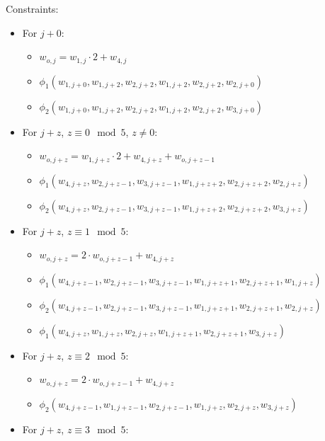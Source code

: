 Constraints:
\begin{itemize}
	\item For $j + 0$:
	\begin{itemize}
		\item $w_{o, j} = w_{1, j} \cdot 2 + w_{4, j}$
		\item $\phi_1(w_{1, j + 0}, w_{1, j + 2}, w_{2, j + 2}, w_{1, j + 2}, w_{2, j + 2}, w_{2, j + 0})$
		\item $\phi_2(w_{1, j + 0}, w_{1, j + 2}, w_{2, j + 2}, w_{1, j + 2}, w_{2, j + 2}, w_{3, j + 0})$
	\end{itemize}
	\item For $j + z$, $z \equiv 0 \mod 5$, $z \neq 0$:
	\begin{itemize}
		\item $w_{o, j + z} = w_{1, j + z} \cdot 2 + w_{4, j + z} + w_{o, j + z - 1}$
		\item $\phi_1(w_{4, j + z}, w_{2, j + z - 1}, w_{3, j + z - 1}, w_{1, j + z + 2}, w_{2, j + z + 2}, w_{2, j + z})$
		\item $\phi_2(w_{4, j + z}, w_{2, j + z - 1}, w_{3, j + z - 1}, w_{1, j + z + 2}, w_{2, j + z + 2}, w_{3, j + z})$
	\end{itemize}
	\item For $j + z$, $z \equiv 1 \mod 5$:
	\begin{itemize}
		\item $w_{o, j + z} = 2 \cdot w_{o, j + z - 1} + w_{4, j + z}$
		\item $\phi_1(w_{4, j + z - 1}, w_{2, j + z - 1}, w_{3, j + z - 1}, w_{1, j + z + 1}, w_{2, j + z + 1}, w_{1, j + z})$
		\item $\phi_2(w_{4, j + z - 1}, w_{2, j + z - 1}, w_{3, j + z - 1}, w_{1, j + z + 1}, w_{2, j + z + 1}, w_{2, j + z})$
		\item $\phi_1(w_{4, j + z }, w_{1, j + z }, w_{2, j + z }, w_{1, j + z + 1}, w_{2, j + z + 1}, w_{3, j + z})$
	\end{itemize}
	\item For $j + z$, $z \equiv 2 \mod 5$:
	\begin{itemize}
		\item $w_{o, j + z} = 2 \cdot w_{o, j + z - 1} + w_{4, j + z}$
		\item $\phi_2(w_{4, j + z - 1}, w_{1, j + z - 1}, w_{2, j + z - 1}, w_{1, j + z}, w_{2, j + z}, w_{3, j + z})$
	\end{itemize}
	\item For $j + z$, $z \equiv 3 \mod 5$:
	\begin{itemize}

\end{itemize}
\end{itemize}
